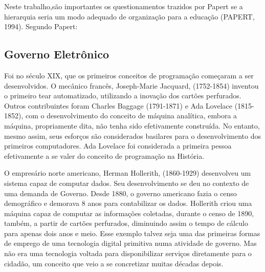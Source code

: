 Neste trabalho,são importantes os questionamentos trazidos por Papert se a hierarquia seria um modo adequado de organização para a educação (PAPERT, 1994). Segundo Papert:


\noindent\begin{flushright}\mbox{\linespread{1}\selectfont\centering{}}\end{flushright}


\subsection[Governo Eletrônico]{Governo Eletrônico}\label{Governo Eletrônico}
Foi no século XIX, que os primeiros conceitos de programação começaram a ser desenvolvidos. O mecânico francês, Joseph-Marie Jacquard, (1752-1854) inventou o primeiro tear automatizado, utilizando a inovação dos cartões perfurados. Outros contribuintes foram Charles Baggage (1791-1871) e Ada Lovelace (1815-1852), com o desenvolvimento do conceito de máquina analítica, embora a máquina, propriamente dita, não tenha sido efetivamente construída. No entanto, mesmo assim, seus esforços são considerados basilares para o desenvolvimento dos primeiros computadores. Ada Lovelace foi considerada a primeira pessoa efetivamente a se valer do conceito de programação na História.

O empresário norte americano, Herman Hollerith, (1860-1929) desenvolveu um sistema capaz de computar dados. Seu desenvolvimento se deu no contexto de uma demanda de Governo. Desde 1880, o governo americano fazia o censo demográfico e demorava 8 anos para contabilizar os dados. Hollerith criou uma máquina capaz de computar as informações coletadas, durante o censo de 1890, também, a partir de cartões perfurados, diminuindo assim o tempo de cálculo para apenas dois anos e meio. Esse exemplo talvez seja uma das primeiras formas de emprego de uma tecnologia digital primitiva numa atividade de governo. Mas não era uma tecnologia voltada para disponibilizar serviços diretamente para o cidadão, um conceito que veio a se concretizar muitas décadas depois.

